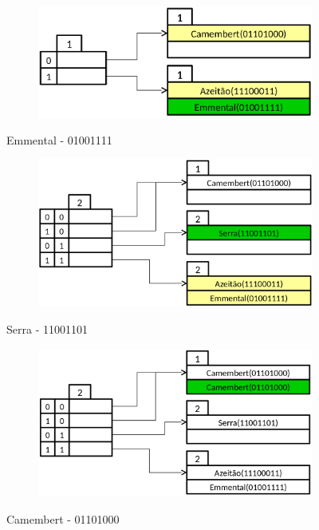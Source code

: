 \begin{figure}[H]
	\begin{center}
	\begin{subfigure}[b]{0.5\textwidth}
		\centering
		\includegraphics[width=\textwidth]{fig4.png}

	\end{subfigure}
	\caption{Emmental - 01001111}
	\end{center}
\end{figure}
\begin{figure}[H]
	\begin{center}
	\begin{subfigure}[b]{0.5\textwidth}
		\centering
		\includegraphics[width=\textwidth]{fig5.png}

	\end{subfigure}
	\caption{Serra - 11001101}
	\end{center}
\end{figure}
\begin{figure}[H]
	\begin{center}
	\begin{subfigure}[b]{0.5\textwidth}
		\centering
		\includegraphics[width=\textwidth]{fig6.png}

	\end{subfigure}
	\caption{Camembert - 01101000}
	\end{center}
\end{figure}
